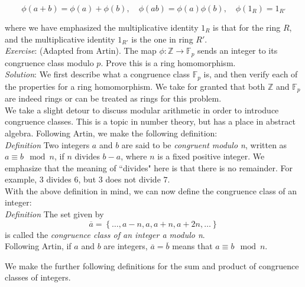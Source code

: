 \begin{displaymath}
\phi(a+b)=\phi(a)+\phi(b), \quad \phi(ab)=\phi(a)\phi(b), \quad \phi(1_{R})=1_{R'}
\end{displaymath}

where we have emphasized the multiplicative identity $1_{R}$ is that for the ring $R$, and the multiplicative identity $1_{R'}$ is the one in ring $R'$.\\

\textit{Exercise}: (Adapted from Artin).  The map $\phi: \mathbb{Z} \longrightarrow \mathbb{F}_{p}$ sends an integer to its congruence class modulo $p$.  Prove this is a ring homomorphism.\\

\textit{Solution}:  We first describe what a congruence class  $\mathbb{F}_{p}$ is, and then verify each of the properties for a ring homomorphism.  We take for granted that both $\mathbb{Z}$ and $\mathbb{F}_{p}$ are indeed rings or can be treated as rings for this problem.\\

We take a slight detour to discuss modular arithmetic  in order to introduce congruence classes.  This is a topic in number theory, but has a place in abstract algebra.  Following Artin, we make the following definition:\\

\textit{Definition} Two integers $a$ and $b$ are said to be \textit{congruent modulo n}, written as $a\equiv b \mod n$, if $n$ divides $b-a$, where $n$ is a fixed positive integer.  We emphasize that the meaning of ``divides" here is that there is no remainder.  For example, $3$ divides $6$, but $3$ does not divide $7$.\\ 

With the above definition in mind, we can now define the congruence class of an integer:\\

\textit{Definition} The set given by 
\begin{displaymath}
\overline{a}=\left\{\ldots, a-n, a, a+n, a+2n, \ldots \right\}
\end{displaymath}
is called the \textit{congruence class of an integer a modulo n}.\\

Following Artin, if $a$ and $b$ are integers, $\overline{a}=\overline{b}$ means that $a \equiv b \mod n$.

We make the further following definitions for the sum and product of congruence classes of integers.\\

